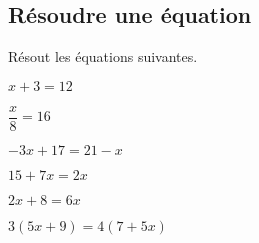 \subsection{Résoudre une équation}

\begin{exercice}
    Résout les équations suivantes.
    \begin{exerciceenumnoeq}
        \item $x+ 3 = 12$
        \item $\dfrac{x}{8} = 16$
        \item $-3x + 17 = 21 - x$
        \item $15 + 7x = 2x$
        \item $2x+8 = 6x$
        \item $3(5x + 9) = 4(7 + 5x)$
    \end{exerciceenumnoeq}
\end{exercice}